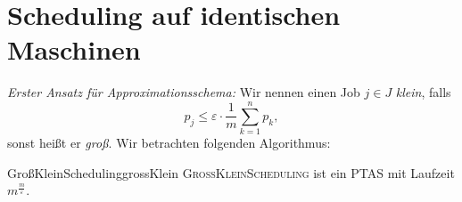\documentclass[language=ngerman,algolist]{TemplateLecture}
\begin{document}

\section{Scheduling auf identischen Maschinen}

\emph{Erster Ansatz für Approximationsschema:} Wir nennen einen Job $j \in J$ \emph{klein}, falls 
\begin{equation*}
    p_j \leq \varepsilon \cdot \frac{1}{m} \sum_{k = 1}^n p_k,
\end{equation*}
sonst heißt er \emph{groß}. Wir betrachten folgenden Algorithmus:

\begin{algorithm}
    \caption{\textsc{GroßKleinScheduling}}\label{alg:grossKlein}
    \begin{algorithmic}[1]
         
    \end{algorithmic}
\end{algorithm}

\begin{thm}{GroßKleinScheduling}{grossKlein}
    \textsc{GroßKleinScheduling} ist ein PTAS mit Laufzeit $m^{\frac{m}{\varepsilon}}$.
\end{thm}
\end{document}
